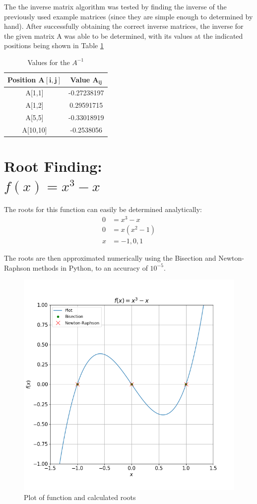 \documentclass[twocolumn]{article}
\begin{document}
The the inverse matrix algorithm was tested by finding the inverse of the previously used example matrices (since they are simple enough to
determined by hand). After successfully obtaining the correct inverse matrices, the inverse for the given matrix A was able to be determined,
with its values at the indicated positions being shown in Table \ref{tab:inv}

\begin{table}[h!]
 \centering
 \begin{tabular}{|c|c|}
 \hline
 \textbf{Position} $\boldsymbol{A[i,j]}$ & \textbf{Value} $\boldsymbol{A_{ij}}$ \\
 \hline
 A[1,1] & -0.27238197 \\
 A[1,2] & 0.29591715 \\
 A[5,5] & -0.33018919 \\
 A[10,10] & -0.2538056 \\
 \hline
 \end{tabular}
 \caption{Values for the $A^{-1}$}
 \label{tab:inv}
\end{table}

\section{Root Finding:\\$f(x)=x^3 - x$}

The roots for this function can easily be determined analytically:
\begin{align*}
 0 &= x^3 - x \\
 0 &= x(x^2 - 1) \\
 x &= -1, 0, 1
\end{align*}

The roots are then approximated numerically using the Bisection and Newton-Raphson methods in Python, to an accuracy of $10^{-5}$.
\begin{figure}[h!]
 \centering
 \includegraphics[scale = 0.4]{f3}
 \caption{Plot of function and calculated roots}
 \label{fig:f3}
\end{figure}
\end{document}
